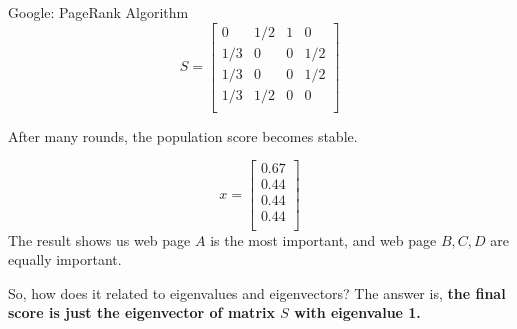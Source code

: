 \documentclass{beamer}
\begin{document}
\begin{frame}{Google: PageRank Algorithm}
\begin{equation*}
    S=\left[ \begin{matrix}
        0&		1/2&		1&		0\\
        1/3&		0&		0&		1/2\\
        1/3&		0&		0&		1/2\\
        1/3&		1/2&		0&		0\\
    \end{matrix} \right]
\end{equation*}

After many rounds, the population score becomes stable.

\begin{equation*}
    x=\left[ \begin{array}{c}
        0.67\\
        0.44\\
        0.44\\
        0.44\\
    \end{array} \right]
\end{equation*}
The result shows us web page $A$ is the most important, and web page $B,C,D$ are equally important.

\vspace{3pt}
So, how does it related to eigenvalues and eigenvectors? The answer is, \textbf{the final score is just the eigenvector of matrix $S$ with eigenvalue 1.}

\end{frame}
\end{document}

